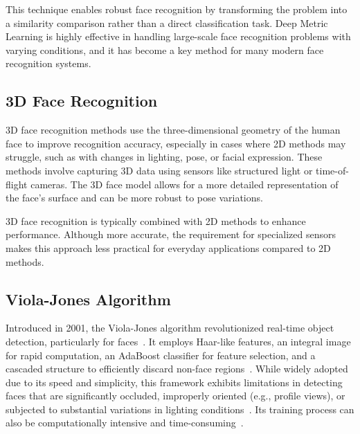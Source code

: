 This technique enables robust face recognition by transforming the problem into a similarity comparison rather than a direct classification task. Deep Metric Learning is highly effective in handling large-scale face recognition problems with varying conditions, and it has become a key method for many modern face recognition systems.

\subsection{3D Face Recognition}
3D face recognition methods use the three-dimensional geometry of the human face to improve recognition accuracy, especially in cases where 2D methods may struggle, such as with changes in lighting, pose, or facial expression. These methods involve capturing 3D data using sensors like structured light or time-of-flight cameras. The 3D face model allows for a more detailed representation of the face's surface and can be more robust to pose variations.

3D face recognition is typically combined with 2D methods to enhance performance. Although more accurate, the requirement for specialized sensors makes this approach less practical for everyday applications compared to 2D methods.

\subsection{Viola-Jones Algorithm}
Introduced in 2001, the Viola-Jones algorithm revolutionized real-time object detection, particularly for faces~\cite{wijaya_trends_2025}. It employs Haar-like features, an integral image for rapid computation, an AdaBoost classifier for feature selection, and a cascaded structure to efficiently discard non-face regions~\cite{wijaya_trends_2025}. While widely adopted due to its speed and simplicity, this framework exhibits limitations in detecting faces that are significantly occluded, improperly oriented (e.g., profile views), or subjected to substantial variations in lighting conditions~\cite{researchgate_evaluation_2023, wijaya_trends_2025}. Its training process can also be computationally intensive and time-consuming~\cite{researchgate_evaluation_2023}.
